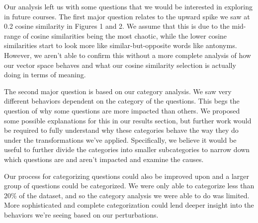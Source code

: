 \documentclass[11pt,a4paper]{article}
\begin{document}
Our analysis left us with some questions that we would be interested in exploring in future courses. The first major question relates to the upward spike we saw at 0.2 cosine similarity in Figures 1 and 2. We assume that this is due to the mid-range of cosine similarities being the most chaotic, while the lower cosine similarities start to look more like similar-but-opposite words like antonyms. However, we aren't able to confirm this without a more complete analysis of how our vector space behaves and what our cosine similarity selection is actually doing in terms of meaning.

The second major question is based on our category analysis. We saw very different behaviors dependent on the category of the questions. This begs the question of why some questions are more impacted than others. We proposed some possible explanations for this in our results section, but further work would be required to fully understand why these categories behave the way they do under the transformations we've applied. Specifically, we believe it would be useful to further divide the categories into smaller subcategories to narrow down which questions are and aren't impacted and examine the causes.

Our process for categorizing questions could also be improved upon and a larger group of questions could be categorized. We were only able to categorize less than 20\% of the dataset, and so the category analysis we were able to do was limited. More sophisticated and complete categorization could lend deeper insight into the behaviors we're seeing based on our perturbations.
\end{document}
